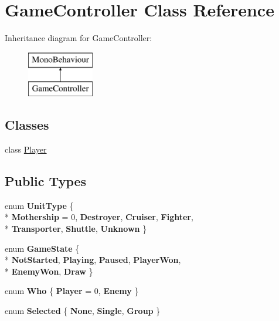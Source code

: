 \hypertarget{class_game_controller}{}\section{Game\+Controller Class Reference}
\label{class_game_controller}
Inheritance diagram for Game\+Controller\+:\begin{figure}[H]
\begin{center}
\leavevmode
\includegraphics[height=2.000000cm]{class_game_controller}
\end{center}
\end{figure}
\subsection*{Classes}
\begin{DoxyCompactItemize}
\item 
class \hyperlink{class_game_controller_1_1_player}{Player}
\end{DoxyCompactItemize}
\subsection*{Public Types}
\begin{DoxyCompactItemize}
\item 
\hypertarget{class_game_controller_ab937754651a2f755bd6ae099c7a43a10}{}enum {\bfseries Unit\+Type} \{ \\*
{\bfseries Mothership} = 0, 
{\bfseries Destroyer}, 
{\bfseries Cruiser}, 
{\bfseries Fighter}, 
\\*
{\bfseries Transporter}, 
{\bfseries Shuttle}, 
{\bfseries Unknown}
 \}\label{class_game_controller_ab937754651a2f755bd6ae099c7a43a10}

\item 
\hypertarget{class_game_controller_a532443f5d4c5992fecce2943dc627a89}{}enum {\bfseries Game\+State} \{ \\*
{\bfseries Not\+Started}, 
{\bfseries Playing}, 
{\bfseries Paused}, 
{\bfseries Player\+Won}, 
\\*
{\bfseries Enemy\+Won}, 
{\bfseries Draw}
 \}\label{class_game_controller_a532443f5d4c5992fecce2943dc627a89}

\item 
\hypertarget{class_game_controller_a2c93703a2af5124f070ee30361edd812}{}enum {\bfseries Who} \{ {\bfseries Player} = 0, 
{\bfseries Enemy}
 \}\label{class_game_controller_a2c93703a2af5124f070ee30361edd812}

\item 
\hypertarget{class_game_controller_a3545f5a2e68f44c964b88e3cbb0fa6a9}{}enum {\bfseries Selected} \{ {\bfseries None}, 
{\bfseries Single}, 
{\bfseries Group}
 \}\label{class_game_controller_a3545f5a2e68f44c964b88e3cbb0fa6a9}

\end{DoxyCompactItemize}
